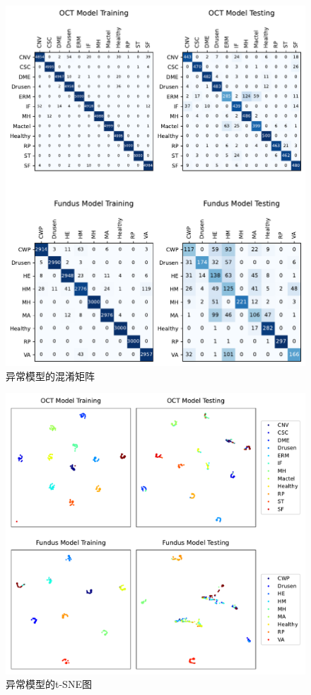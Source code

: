 \documentclass{article}
\begin{document}
		\begin{figure}[htbp]
			\centering
			\includegraphics[width=\linewidth]{Figs/abnormity_confusion_matrix.pdf}
			\caption{异常模型的混淆矩阵}
			\vspace{0.3cm}
			\label{fig:A_conf_mat}
		\end{figure}
		
		\begin{figure}[htbp]
			\centering
			\includegraphics[width=\linewidth]{Figs/abnormity_tSNE.pdf}
			\caption{异常模型的t-SNE图}
			\vspace{0.3cm}
			\label{fig:A_tSNE}
		\end{figure}
		
\end{document}
